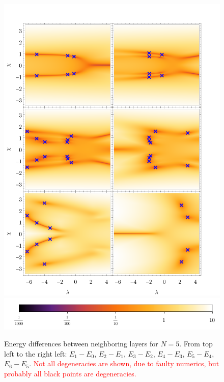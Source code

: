 \begin{figure}[h]
    \centering
    \includegraphics[scale=1.3]{../img/singularitiesBetweenEnergiesN=6.pdf}
    \includegraphics[scale=1.3]{../img/N=5_bar6.pdf}
    \caption{Energy differences between neighboring layers for $N=5$. From top left to the right left: $E_1-E_0$, $E_2-E_1$, $E_3-E_2$, $E_4-E_3$, $E_5-E_4$, $E_6-E_5$. \textcolor{red}{Not all degeneracies are shown, due to faulty numerics, but probably all black points are degeneracies.} }
    \label{fig:singularitiesBetweenEnergiesN=6}    
\end{figure}



